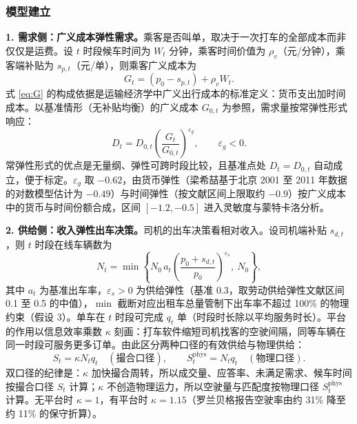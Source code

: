\documentclass[12pt,a4paper]{ctexart}
\begin{document}
\subsubsection{模型建立}

\textbf{1. 需求侧：广义成本弹性需求。}乘客是否叫单，取决于一次打车的全部成本而非仅仅是运费。设 $t$ 时段候车时间为 $W_t$ 分钟，乘客时间价值为 $\rho_v$（元/分钟），乘客端补贴为 $s_{p,t}$（元/单），则乘客广义成本为
\begin{equation}
G_t = (p_0 - s_{p,t}) + \rho_v W_t . \label{eq:G}
\end{equation}
式 \eqref{eq:G} 的构成依据是运输经济学中广义出行成本的标准定义：货币支出加时间成本。以基准情形（无补贴均衡）的广义成本 $G_{0,t}$ 为参照，需求量按常弹性形式响应：
\begin{equation}
D_t = D_{0,t}\left(\frac{G_t}{G_{0,t}}\right)^{\varepsilon_g}, \qquad \varepsilon_g < 0 . \label{eq:D}
\end{equation}
常弹性形式的优点是无量纲、弹性可跨时段比较，且基准点处 $D_t=D_{0,t}$ 自动成立，便于标定。$\varepsilon_g$ 取 $-0.62$，由货币弹性（梁希喆基于北京 2001 至 2011 年数据的对数模型估计为 $-0.49$）与时间弹性（按文献区间上限取约 $-0.9$）按广义成本中的货币与时间份额合成，区间 $[-1.2,-0.5]$ 进入灵敏度与蒙特卡洛分析。

\textbf{2. 供给侧：收入弹性出车决策。}司机的出车决策看相对收入。设司机端补贴 $s_{d,t}$，则 $t$ 时段在线车辆数为
\begin{equation}
N_t = \min\left\{N_0\, a_t \left(\frac{p_0+s_{d,t}}{p_0}\right)^{\varepsilon_s},\ N_0\right\}, \label{eq:N}
\end{equation}
其中 $a_t$ 为基准出车率，$\varepsilon_s>0$ 为供给弹性（基准 0.3，取劳动供给弹性文献区间 0.1 至 0.5 的中值），$\min$ 截断对应出租车总量管制下出车率不超过 100\% 的物理约束（假设 3）。单车在 $t$ 时段可完成 $q_t$ 单（时段时长除以平均服务时长）。平台的作用以信息效率乘数 $\kappa$ 刻画：打车软件缩短司机找客的空驶间隔，同等车辆在同一时段可服务更多订单。由此区分两种口径的有效供给与物理供给：
\begin{equation}
S_t = \kappa N_t q_t \quad(\text{撮合口径}), \qquad S_t^{\mathrm{phys}} = N_t q_t \quad(\text{物理口径}) . \label{eq:S}
\end{equation}
双口径的纪律是：$\kappa$ 加快撮合周转，所以成交量、应答率、未满足需求、候车时间按撮合口径 $S_t$ 计算；$\kappa$ 不创造物理运力，所以空驶量与匹配度按物理口径 $S_t^{\mathrm{phys}}$ 计算。无平台时 $\kappa=1$，有平台时 $\kappa=1.15$（罗兰贝格报告空驶率由约 31\% 降至约 11\% 的保守折算）。
\end{document}
